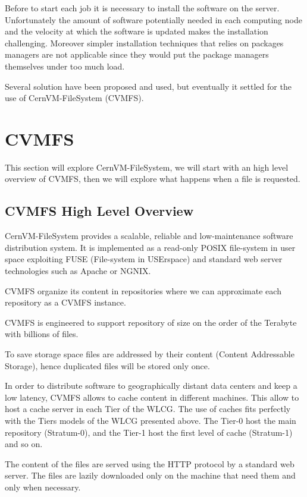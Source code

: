 Before to start each job it is necessary to install the software on the server.
Unfortunately the amount of software potentially needed in each computing node
and the velocity at which the software is updated makes the installation
challenging. Moreover simpler installation techniques that relies on packages
managers are not applicable since they would put the package managers
themselves under too much load.

Several solution have been proposed and used, but eventually it settled for the
use of CernVM-FileSystem (CVMFS).

\section{CVMFS}

This section will explore CernVM-FileSystem, we will start with an high level
overview of CVMFS, then we will explore what happens when a file is requested.


\subsection{CVMFS High Level Overview}

CernVM-FileSystem provides a scalable, reliable and low-maintenance software
distribution system. It is implemented as a read-only POSIX file-system in user
space exploiting FUSE (File-system in USErspace) and standard web server
technologies such as Apache or NGNIX.

CVMFS organize its content in repositories where we can approximate each
repository as a CVMFS instance.

CVMFS is engineered to support repository of size on the order of the Terabyte
with billions of files.

To save storage space files are addressed by their content (Content Addressable
Storage), hence duplicated files will be stored only once.

In order to distribute software to geographically distant data centers and keep
a low latency, CVMFS allows to cache content in different machines. This allow
to host a cache server in each Tier of the WLCG. The use of caches fits
perfectly with the Tiers models of the WLCG presented above. The Tier-0 host
the main repository (Stratum-0), and the Tier-1 host the first level of cache
(Stratum-1) and so on.

The content of the files are served using the HTTP protocol by a standard
web server. The files are lazily downloaded only on the machine that need them
and only when necessary.

